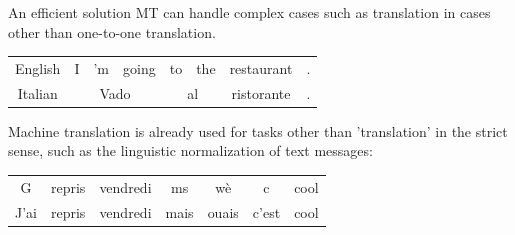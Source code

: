 \documentclass[aspectratio=169]{beamer}
\begin{document}
    \begin{frame}{An efficient solution}
        MT can handle complex cases such as translation in cases other than one-to-one translation.
        \begin{table}[]
            \centering
            \begin{tabular}{c||ccccccc}
                English & I & 'm & going & to & the & restaurant & . \\
                Italian & \multicolumn{3}{c}{Vado} & \multicolumn{2}{c}{al} & ristorante & . \\
            \end{tabular}
            \label{tab:problems}
        \end{table}

        Machine translation is already used for tasks other than 'translation' in the strict sense, such as the linguistic normalization of text messages:

	   \begin{table}[h]
	       \centering
	       \begin{tabular}{ccccccc}
	       G & repris & vendredi  & ms & wè & c & cool  \\
	       J'ai & repris & vendredi & mais & ouais & c'est & cool
	       \end{tabular}
	       \label{tab:normalisation}
	    \end{table}
    \end{frame}

\end{document}
